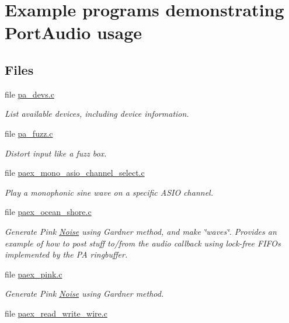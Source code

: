 \hypertarget{group__examples__src}{}\section{Example programs demonstrating Port\+Audio usage}
\label{group__examples__src}
\subsection*{Files}
\begin{DoxyCompactItemize}
\item 
file \hyperlink{pa__devs_8c}{pa\+\_\+devs.\+c}
\begin{DoxyCompactList}\small\item\em List available devices, including device information. \end{DoxyCompactList}\item 
file \hyperlink{pa__fuzz_8c}{pa\+\_\+fuzz.\+c}
\begin{DoxyCompactList}\small\item\em Distort input like a fuzz box. \end{DoxyCompactList}\item 
file \hyperlink{paex__mono__asio__channel__select_8c}{paex\+\_\+mono\+\_\+asio\+\_\+channel\+\_\+select.\+c}
\begin{DoxyCompactList}\small\item\em Play a monophonic sine wave on a specific A\+S\+IO channel. \end{DoxyCompactList}\item 
file \hyperlink{paex__ocean__shore_8c}{paex\+\_\+ocean\+\_\+shore.\+c}
\begin{DoxyCompactList}\small\item\em Generate Pink \hyperlink{class_noise}{Noise} using Gardner method, and make \char`\"{}waves\char`\"{}. Provides an example of how to post stuff to/from the audio callback using lock-\/free F\+I\+F\+Os implemented by the PA ringbuffer. \end{DoxyCompactList}\item 
file \hyperlink{paex__pink_8c}{paex\+\_\+pink.\+c}
\begin{DoxyCompactList}\small\item\em Generate Pink \hyperlink{class_noise}{Noise} using Gardner method. \end{DoxyCompactList}\item 
file \hyperlink{paex__read__write__wire_8c}{paex\+\_\+read\+\_\+write\+\_\+wire.\+c}

\end{DoxyCompactItemize}
